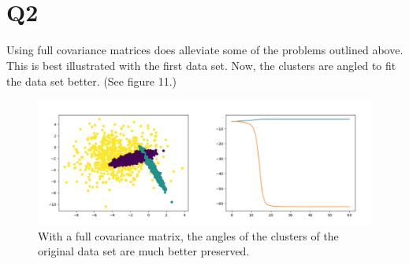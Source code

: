 \documentclass{article}
\begin{document}
~\\
~\\
~\\
~\\
~\\
~\\
~\\
~\\
~\\
~\\
~\\
~\\
~\\
~\\
~\\
~\\
~\\
~\\
~\\
~\\
~\\
~\\
~\\
~\\
~\\
~\\
~\\
~\\
~\\

\section{Q2}

Using full covariance matrices does alleviate some of the problems outlined 
above. This is best illustrated with the first data set. Now, the clusters are 
angled to fit the data set better. (See figure 11.)

\begin{figure}[!ht]
	\centering
	\includegraphics[width=120mm]{figs/gmm_ds0_k3_covar_plt_ll.png}
	\caption{With a full covariance matrix, the angles of the clusters of the 
        original data set are much better preserved.}
\end{figure}
\end{document}

